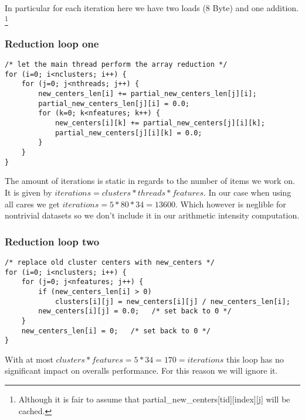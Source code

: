 \documentclass[]{article}
\begin{document}
In particular for each iteration here we have two loads (8 Byte) and one addition.
\footnote{Although it is fair to assume that  partial\_new\_centers[tid][index][j] will be cached.}


\subsubsection{Reduction loop one}
\begin{lstlisting}[caption={Reduction pt1}]
/* let the main thread perform the array reduction */
for (i=0; i<nclusters; i++) {
	for (j=0; j<nthreads; j++) {
		new_centers_len[i] += partial_new_centers_len[j][i];
		partial_new_centers_len[j][i] = 0.0;
		for (k=0; k<nfeatures; k++) {
			new_centers[i][k] += partial_new_centers[j][i][k];
			partial_new_centers[j][i][k] = 0.0;
		}
	}
}
\end{lstlisting}

The amount of iterations is static in regards to the number of items we work on.
It is given by $ iterations = clusters * threads * features$.
In our case when using all cares we get $ iterations = 5 * 80  * 34 = 13600$.
Which however is neglible for nontrivial datasets so we don't include it in our arithmetic intensity computation. 

%
%

\subsubsection{Reduction loop two}
\begin{lstlisting}[caption={Reduction pt2}]
/* replace old cluster centers with new_centers */
for (i=0; i<nclusters; i++) {
	for (j=0; j<nfeatures; j++) {
		if (new_centers_len[i] > 0)
			clusters[i][j] = new_centers[i][j] / new_centers_len[i];
		new_centers[i][j] = 0.0;   /* set back to 0 */
	}
	new_centers_len[i] = 0;   /* set back to 0 */
}
\end{lstlisting}
With at most $clusters * features = 5 * 34 = 170 = iterations$ this loop has no significant impact on overalls performance.
For this reason we will ignore it.
\end{document}

